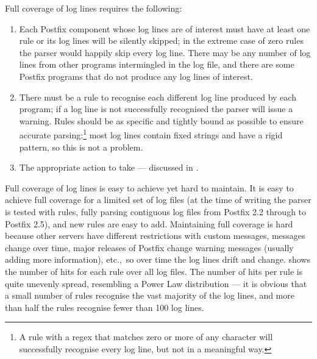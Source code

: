 Full coverage of log lines requires the following:

\begin{enumerate}

    \item Each Postfix component whose log lines are of interest must have
        at least one rule or its log lines will be silently skipped; in the
        extreme case of zero rules the parser would happily skip every log
        line.  There may be any number of log lines from other programs
        intermingled in the log file, and there are some Postfix programs
        that do not produce any log lines of interest.

    \item There must be a rule to recognise each different log line
        produced by each program; if a log line is not successfully
        recognised the parser will issue a warning.  Rules should be as
        specific and tightly bound as possible to ensure accurate
        parsing:\footnote{A rule with a regex that matches zero or more of
        any character will successfully recognise every log line, but not
        in a meaningful way.} most log lines contain fixed strings and have
        a rigid pattern, so this is not a problem.

    \item The appropriate action to take --- discussed in
        .

\end{enumerate}

Full coverage of log lines is easy to achieve yet hard to maintain.  It is
easy to achieve full coverage for a limited set of log files (at the time
of writing the parser is tested with \numberOFrules{} rules, fully parsing
\numberOFlogFILESall{} contiguous log files from Postfix 2.2 through to
Postfix 2.5), and new rules are easy to add.  Maintaining full coverage is
hard because other servers have different restrictions with custom
messages,  messages change over time, major releases of
Postfix change warning messages (usually adding more information), etc.,\
so over time the log lines drift and change.  
shows the number of hits for each rule over all \numberOFlogFILES{} log
files.  The number of hits per rule is quite unevenly spread, resembling a
Power Law distribution --- it is obvious that a small number of rules
recognise the vast majority of the log lines, and more than half the rules
recognise fewer than 100 log lines.

